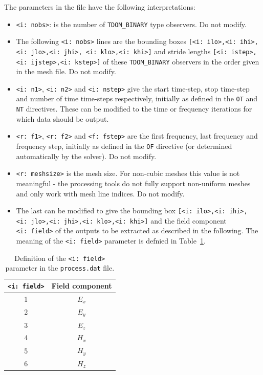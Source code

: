 \documentclass[onecolumn,a4paper]{article}
\numberwithin{equation}{section}
\begin{document}
The parameters in the file have the following interpretations:
\begin{itemize}
 \item \texttt{<i:~nobs>}: is the number of \texttt{TDOM\_BINARY} type observers. Do not modify.
 \item The following \texttt{<i:~nobs>} lines are the bounding boxes 
 \texttt{[<i:~ilo>,<i:~ihi>,<i:~jlo>,<i:~jhi>, <i:~klo>,<i:~khi>]} and stride lengths 
 \texttt{[<i:~istep>,<i:~ijstep>,<i:~kstep>]} of these \texttt{TDOM\_BINARY} observers in the order given in the mesh file. 
 Do not modify.
 \item \texttt{<i:~n1>}, \texttt{<i:~n2>} and \texttt{<i:~nstep>} give the start time-step, stop time-step
  and number of time time-steps respectively, initially as defined in the \texttt{OT} and \texttt{NT} directives.
  These can be modified to the time or frequency iterations for which data should be output.
 \item \texttt{<r:~f1>}, \texttt{<r:~f2>} and \texttt{<f:~fstep>} are the first frequency, last frequency
 and frequency step, initially as defined in the \texttt{OF} directive (or determined automatically by the solver). Do not modify.
 \item \texttt{<r:~meshsize>} is the mesh size. For non-cubic meshes this value is not meaningful - the processing 
 tools do not fully support non-uniform meshes and only work with mesh line indices. Do not modify.
 \item The last can be modified to give the bounding box \texttt{[<i:~ilo>,<i:~ihi>,<i:~jlo>,<i:~jhi>,<i:~klo>,<i:~khi>]} and the
 field component \texttt{<i:~field>} of the outputs to be extracted as described in the following. The meaning of the
  \texttt{<i:~field>} parameter is defnied in Table~\ref{tb:ppfield}.
\end{itemize}

\begin{table}[ht]
\begin{center}
\begin{tabular}{|c|c|}
\hline
\texttt{<i:~field>} & Field component \\ 
\hline
1                   & $E_x$           \\
2                   & $E_y$           \\
3                   & $E_z$           \\
4                   & $H_x$           \\
5                   & $H_y$           \\
6                   & $H_z$           \\ 
\hline
\end{tabular}
\caption{\label{tb:ppfield}Definition of the \texttt{<i:~field>} parameter in the \texttt{process.dat} file.}
\end{center}
\end{table}
\end{document}
